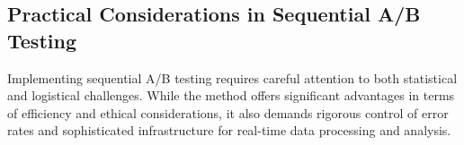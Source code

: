 \documentclass[magisterska, english]{pwr_wmat_praca_dyplomowa}
\theoremstyle{plain}
\numberwithin{theorem}{chapter}
\theoremstyle{definition}
\numberwithin{theorem}{chapter}
\begin{document}
%
%
%
%
%
%
%

\subsection{Practical Considerations in Sequential A/B Testing}

Implementing sequential A/B testing requires careful attention to both statistical and logistical challenges. While the method offers significant advantages in terms of efficiency and ethical considerations, it also demands rigorous control of error rates and sophisticated infrastructure for real-time data processing and analysis.
\end{document}
